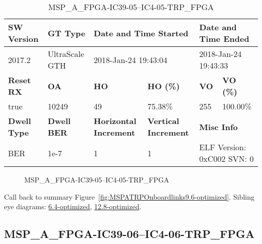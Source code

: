 \begin{table}[h]
\centering
\caption{MSP\_A\_FPGA-IC39-05--IC4-05-TRP\_FPGA}
\label{tab:MSPAFPGAIC3905IC405TRPFPGA9.6-optimized}
\begin{tabular}{@{}|l|l|l|l|l|l|@{}}
\toprule
\textbf{SW Version}                & \textbf{GT Type}   & \multicolumn{2}{l|}{\textbf{Date and Time Started}}            & \multicolumn{2}{l|}{\textbf{Date and Time Ended}}        \\ \midrule
2017.2                       & UltraScale GTH          & \multicolumn{2}{l|}{2018-Jan-24 19:43:04}                   & \multicolumn{2}{l|}{2018-Jan-24 19:43:33}               \\ \midrule
\textbf{Reset RX}                  & \textbf{OA} & \textbf{HO}   & \textbf{HO (\%)} & \textbf{VO} & \textbf{VO (\%)} \\ \midrule
true & 10249        & 49          & 75.38\%        & 255        & 100.00\%       \\ \midrule
\textbf{Dwell Type}                & \textbf{Dwell BER} & \textbf{Horizontal Increment} & \textbf{Vertical Increment}    & \multicolumn{2}{l|}{\textbf{Misc Info}}                  \\ \midrule
BER                            & 1e-7        & 1        & 1           & \multicolumn{2}{l|}{ELF Version: 0xC002 SVN: 0}                         \\ \bottomrule
\end{tabular}
\end{table}

\begin{figure}[h]
\caption{MSP\_A\_FPGA-IC39-05--IC4-05-TRP\_FPGA} \label{fig:MSPAFPGAIC3905IC405TRPFPGA9.6-optimized}
\end{figure}

Call back to summary Figure~\ref{fig:MSPATRPOnboardlinks9.6-optimized}.
Sibling eye diagrams: \hyperref[sec:MSPAFPGAIC3905IC405TRPFPGA6.4-optimized]{6.4-optimized}, \hyperref[sec:MSPAFPGAIC3905IC405TRPFPGA12.8-optimized]{12.8-optimized}.

\clearpage
\newpage


\subsection{MSP\_A\_FPGA-IC39-06--IC4-06-TRP\_FPGA}\label{sec:MSPAFPGAIC3906IC406TRPFPGA9.6-optimized}

